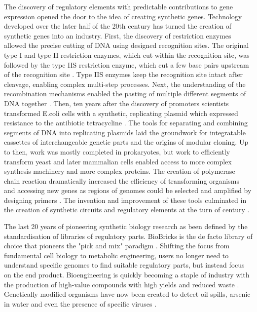 \documentclass[../main.tex]{subfiles}
\begin{document}
The discovery of regulatory elements with predictable contributions to gene expression opened the door to the idea of creating synthetic genes.
Technology developed over the later half of the 20th century has turned the creation of synthetic genes into an industry.
First, the discovery of restriction enzymes allowed the precise cutting of DNA using designed recognition sites. 
The original type I and type II restriction enzymes, which cut within the recognition site, \parencite{Arber2003,Meselson1968,Smith1970,Kelly1970} was followed by the type IIS restriction enzyme, which cut a few base pairs upstream of the recognition site \parencite{Pingoud2014}. 
Type IIS enzymes keep the recognition site intact after cleavage, enabling complex multi-step processes.
Next, the understanding of the recombination mechanisms enabled the pasting of multiple different segments of DNA together \parencite{Jackson1972,Cohen1973}. 
Then, ten years after the discovery of promoters scientists transformed E.coli cells with a synthetic, replicating plasmid which expressed resistance to the antibiotic tetracycline \parencite{Cohen1973}. 
The tools for separating and combining segments of DNA into replicating plasmids laid the groundwork for integratable cassettes of interchangeable genetic parts and the origins of modular cloning.
Up to then, work was mostly completed in prokaryotes, but work to efficiently transform yeast \parencite{Beggs1978} and later mammalian cells \parencite{Capecchi1989} enabled access to more complex synthesis machinery and more complex proteins. 
The creation of polymerase chain reaction dramatically increased the efficiency of transforming organisms and accessing new genes as regions of genomes could be selected and amplified by designing primers \parencite{Saiki1988}. 
The invention and improvement of these tools culminated in the creation of synthetic circuits and regulatory elements at the turn of century \parencite{Elowitz2000,Gardner2000}.

The last 20 years of pioneering synthetic biology research as been defined by the standardisation of libraries of regulatory parts. 
BioBricks is the de facto library of choice that pioneers the "pick and mix" paradigm \parencite{Knight2003}.
Shifting the focus from fundamental cell biology to metabolic engineering, users no longer need to understand specific genomes to find suitable regulatory parts, but instead focus on the end product. 
Bioengineering is quickly becoming a staple of industry with the production of high-value compounds with high yields and reduced waste \parencite{Krivoruchko2015}.
Genetically modified organisms have now been created to detect oil spills, arsenic in water and even the presence of specific viruses \parencite{Wan2019,Willardson1998,Tancharoen2019}.
\end{document}

